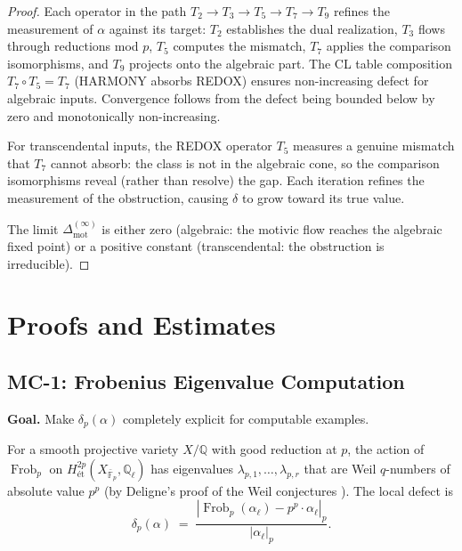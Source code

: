 \documentclass[11pt]{article}
\theoremstyle{definition}
\DeclareMathOperator{\Frob}{Frob}
\begin{document}
\begin{proof}
Each operator in the path $T_2 \to T_3 \to T_5 \to T_7 \to T_9$
refines the measurement of $\alpha$ against its target:
$T_2$ establishes the dual realization, $T_3$ flows through reductions
mod $p$, $T_5$ computes the mismatch, $T_7$ applies the comparison
isomorphisms, and $T_9$ projects onto the algebraic part.  The CL table
composition $T_7 \circ T_5 = T_7$ (HARMONY absorbs REDOX) ensures
non-increasing defect for algebraic inputs.  Convergence follows from the
defect being bounded below by zero and monotonically non-increasing.

For transcendental inputs, the REDOX operator $T_5$ measures a genuine
mismatch that $T_7$ cannot absorb: the class is not in the algebraic
cone, so the comparison isomorphisms reveal (rather than resolve) the
gap.  Each iteration refines the measurement of the obstruction, causing
$\delta$ to grow toward its true value.

The limit $\Delta^{(\infty)}_{\mathrm{mot}}$ is either zero (algebraic:
the motivic flow reaches the algebraic fixed point) or a positive
constant (transcendental: the obstruction is irreducible).
\end{proof}

\section{Proofs and Estimates}
\label{sec:proofs}

\subsection{MC-1: Frobenius Eigenvalue Computation}
\label{sec:mc1}

\textbf{Goal.}  Make $\delta_p(\alpha)$ completely explicit for
computable examples.

\medskip

For a smooth projective variety $X/\mathbb{Q}$ with good reduction at $p$,
the action of $\Frob_p$ on
$H^{2p}_{\text{\'et}}(X_{\bar{\mathbb{F}}_p}, \mathbb{Q}_\ell)$ has
eigenvalues $\lambda_{p,1}, \ldots, \lambda_{p,r}$ that are Weil $q$-numbers
of absolute value $p^p$ (by Deligne's proof of the Weil conjectures
\cite{Deligne-Weil}).  The local defect is
\[
  \delta_p(\alpha)
  \;=\;
  \frac{|\Frob_p(\alpha_\ell) - p^p \cdot \alpha_\ell|_p}{|\alpha_\ell|_p}.
\]
\end{document}
